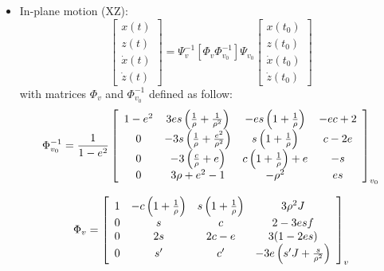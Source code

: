 \begin{itemize}
	\item In-plane motion (XZ):
	\begin{equation}\label{eq:ya_xz}
		\left[ \begin{array} { l } { x ( t ) } \\ { z ( t ) } \\ { \dot { x } ( t ) } \\ { \dot { z } ( t ) } \end{array} \right] = \Psi _ { v } ^ { - 1 } \left[ \Phi _ { v } \Phi _ { v _ { 0 } } ^ { - 1 } \right]  \Psi _ { v _ { 0 } } \left[ \begin{array} { c } { x \left( t _ { 0 } \right) } \\ { z \left( t _ { 0 } \right) } \\ { \dot { x } \left( t _ { 0 } \right) } \\ { \dot { z } \left( t _ { 0 } \right) } \end{array} \right]
	\end{equation}{}
	with matrices $\Phi _ { v }$ and $\Phi _ { v _ { 0 } } ^ { - 1 }$ defined as follow:
	\begin{equation}
		\Phi _ { v _ { 0 } } ^ { - 1 } = \frac{1}{1-e^2}
		\left[ \begin{array} { c c c c } { 1 - e ^ { 2 } } & { 3 e s \left( \frac { 1 } { \rho } + \frac { 1 } { \rho ^ { 2 } } \right)  } & { - e s \left( 1 + \frac { 1 } { \rho } \right) } & { - e c + 2 } \\ { 0 } & { - 3 s \left( \frac { 1 } { \rho } + \frac { e ^ { 2 } } { \rho ^ { 2 } } \right) } & { s \left( 1 + \frac { 1 } { \rho } \right) } & { c - 2 e } \\ { 0 } & { - 3 \left( \frac { c } { \rho } + e \right) } & { c \left( 1 + \frac { 1 } { \rho } \right) + e } & { - s } \\ { 0 } & { 3 \rho + e ^ { 2 } - 1 } & { - \rho ^ { 2 } } & { e s } \end{array} \right] _ { v _ { 0 } }
	\end{equation}{}
	
	\begin{equation}
		\Phi _ { v } = \left[ \begin{array} { c c c c } { 1 } & { - c \left( 1 + \frac { 1 } { \rho } \right) } & { s \left( 1 + \frac { 1 } { \rho } \right) } & { 3 \rho ^ { 2 } J } \\ { 0 } & { s } & { c } & { 2 - 3 e s f } \\ { 0 } & { 2 s } & { 2 c - e } & { 3 ( 1 - 2 e s ) } \\ { 0 } & { s ^ { \prime } } & { c ^ { \prime } } & { - 3 e \left( s ^ { \prime }J + \frac { s } { \rho ^ { 2 } } \right) } \end{array} \right]_v
	\end{equation}{}
	

\end{itemize}
